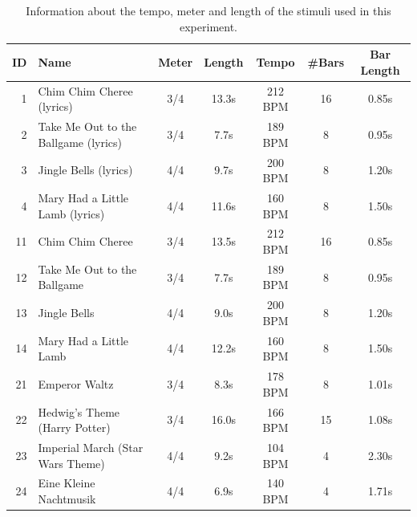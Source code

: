 \begin{table}[t]
\setlength{\tabcolsep}{2.5pt}  %
\renewcommand{\arraystretch}{1}
\centering
\caption{Information about the tempo, meter and length of the stimuli used in this experiment.}
\label{tab:stimuli_information}
{\footnotesize %
\begin{tabularx}{\columnwidth}{r l c c  c c c }
\toprule
ID		& Name							&Meter 	& Length	& Tempo 		&\#Bars	& Bar Length\\
\midrule
1		& Chim Chim Cheree (lyrics)			& 3/4		& 13.3s 			& 212 BPM 	& 16				& 0.85s	\\ %
2		& Take Me Out to the Ballgame (lyrics)	& 3/4		& 7.7s 			& 189 BPM 	& 8				& 0.95s	\\ %
3		& Jingle Bells (lyrics)					& 4/4		& 9.7s 			& 200 BPM 	& 8				& 1.20s	\\ %
4		& Mary Had a Little Lamb (lyrics)		& 4/4		& 11.6s			& 160 BPM 	& 8				& 1.50s	\\ %
11		& Chim Chim Cheree 				& 3/4		& 13.5s	 		& 212 BPM 	& 16				& 0.85s	\\ %
12		& Take Me Out to the Ballgame			& 3/4		& 7.7s 			& 189 BPM 	& 8				& 0.95s	\\ %
13		& Jingle Bells 						& 4/4		& 9.0s 			& 200 BPM 	& 8				& 1.20s	\\ %
14		& Mary Had a Little Lamb				& 4/4		& 12.2s			& 160 BPM 	& 8				& 1.50s	\\ %
21		& Emperor Waltz					& 3/4		& 8.3s 			& 178 BPM 	& 8				& 1.01s	\\ %
22		& Hedwig's Theme (Harry Potter)		& 3/4		& 16.0s	 		& 166 BPM 	& 15				& 1.08s	\\ %
23		& Imperial March (Star Wars Theme)		& 4/4		& 9.2s 			& 104 BPM 	& 4				& 2.30s	\\ %
24		& Eine Kleine Nachtmusik				& 4/4		& 6.9s			& 140 BPM 	& 4				& 1.71s	\\ %
\bottomrule
\end{tabularx}
}
\end{table}


